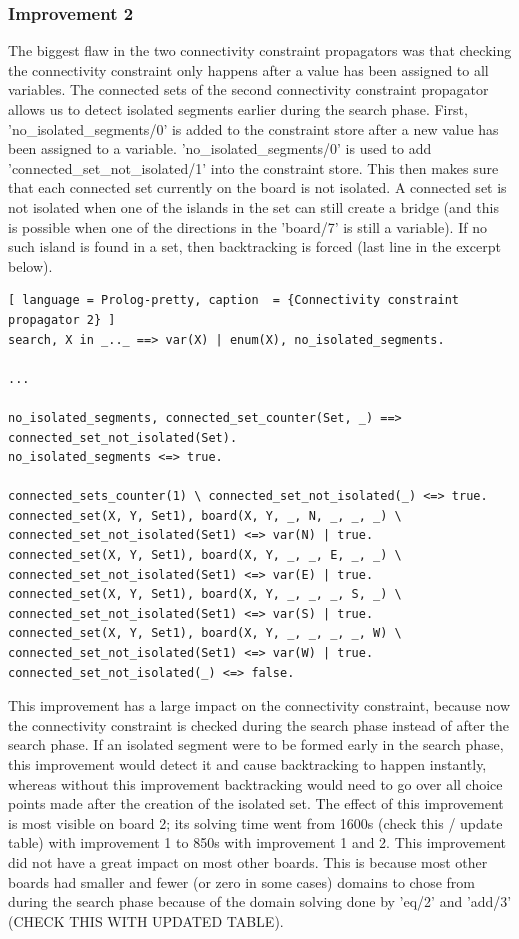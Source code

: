 \documentclass{report}
\begin{document}
\subsubsection{Improvement 2}
\label{sec:improvement2}
The biggest flaw in the two connectivity constraint propagators was that checking the connectivity constraint only happens after a value has been assigned to all variables. The connected sets of the second connectivity constraint propagator allows us to detect isolated segments earlier during the search phase. First,  'no\_isolated\_segments/0' is added to the constraint store after a new value has been assigned to a variable. 'no\_isolated\_segments/0' is used to add 'connected\_set\_not\_isolated/1' into the constraint store. This then makes sure that each connected set currently on the board is not isolated. A connected set is not isolated when one of the islands in the set can still create a bridge (and this is possible when one of the directions in the 'board/7' is still a variable). If no such island is found in a set, then backtracking is forced (last line in the excerpt below). 

\begin{lstlisting}[ language = Prolog-pretty, caption  = {Connectivity constraint propagator 2} ]
search, X in _.._ ==> var(X) | enum(X), no_isolated_segments.

...

no_isolated_segments, connected_set_counter(Set, _) ==> connected_set_not_isolated(Set).
no_isolated_segments <=> true.

connected_sets_counter(1) \ connected_set_not_isolated(_) <=> true.
connected_set(X, Y, Set1), board(X, Y, _, N, _, _, _) \ connected_set_not_isolated(Set1) <=> var(N) | true.
connected_set(X, Y, Set1), board(X, Y, _, _, E, _, _) \ connected_set_not_isolated(Set1) <=> var(E) | true.
connected_set(X, Y, Set1), board(X, Y, _, _, _, S, _) \ connected_set_not_isolated(Set1) <=> var(S) | true.
connected_set(X, Y, Set1), board(X, Y, _, _, _, _, W) \ connected_set_not_isolated(Set1) <=> var(W) | true.
connected_set_not_isolated(_) <=> false.
\end{lstlisting}

This improvement has a large impact on the connectivity constraint, because now the connectivity constraint is checked during the search phase instead of after the search phase. If an isolated segment were to be formed early in the search phase, this improvement would detect it and cause backtracking to happen instantly, whereas without this improvement backtracking would need to go over all choice points made after the creation of the isolated set. The effect of this improvement is most visible on board 2; its solving time went from 1600s (check this / update table) with improvement 1 to 850s with improvement 1 and 2. This improvement did not have a great impact on most other boards. This is because most other boards had smaller and fewer (or zero in some cases) domains to chose from during the search phase because of the domain solving done by 'eq/2' and 'add/3' (CHECK THIS WITH UPDATED TABLE).
\end{document}
